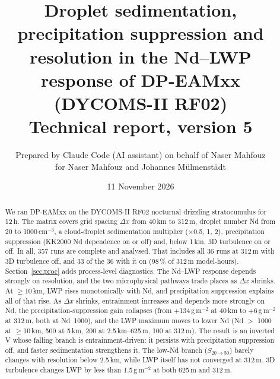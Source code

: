 \documentclass[10pt]{article}
\title{\bfseries Droplet sedimentation, precipitation suppression and resolution in the Nd--LWP response of DP-EAMxx (DYCOMS-II RF02)\\[4pt]\large Technical report, version 5}
\author{Prepared by Claude Code (AI assistant) on behalf of Naser Mahfouz\\ for Naser Mahfouz and Johannes M\"ulmenst\"adt}
\date{11 November 2026}
\begin{document}
\sloppy
\maketitle

\begin{abstract}\noindent
We ran DP-EAMxx on the DYCOMS-II RF02 nocturnal drizzling stratocumulus for 12\,h. The matrix covers grid spacing $\Delta x$ from 40\,km to 312\,m,
droplet number Nd from 20 to 1000\,cm$^{-3}$, a cloud-droplet sedimentation multiplier ($\times$0.5, 1, 2), precipitation suppression
(KK2000 Nd dependence on or off) and, below 1\,km, 3D turbulence on or off. In all, 357 runs are complete and analysed. That includes all 36 runs at 312\,m with 3D turbulence off, and 33 of the 36 with it on (98\,\% of 312\,m model-hours). Section~\ref{sec:proc} adds process-level diagnostics.
The Nd--LWP response depends strongly on resolution, and the two microphysical pathways trade places as $\Delta x$ shrinks.
At $\geq$10\,km, LWP rises monotonically with Nd, and precipitation suppression explains all of that rise.
As $\Delta x$ shrinks, entrainment increases and depends more strongly on Nd, the precipitation-suppression gain collapses
(from +134\,g\,m$^{-2}$ at 40\,km to +6\,g\,m$^{-2}$ at 312\,m, both at Nd~1000), and the LWP maximum moves to lower Nd
(Nd $>$ 1000 at $\geq$10\,km, 500 at 5\,km, 200 at 2.5\,km--625\,m, 100 at 312\,m). The result is an inverted V whose falling branch is
entrainment-driven: it persists with precipitation suppression off, and faster sedimentation strengthens it. The low-Nd branch ($S_{20\to50}$) barely changes with
resolution below 2.5\,km, while LWP itself has not converged at 312\,m. 3D turbulence changes LWP by less than 1.5\,g\,m$^{-2}$ at both 625\,m and 312\,m.
\end{abstract}
\end{document}
